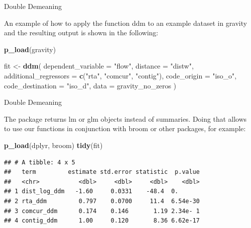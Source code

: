 \documentclass[ignorenonframetext,compress,aspectratio=169]{beamer}
\newenvironment{Shaded}{\begin{snugshade}}{\end{snugshade}}
\newcommand{\KeywordTok}[1]{\textcolor[rgb]{0.13,0.29,0.53}{\textbf{#1}}}
\newcommand{\DataTypeTok}[1]{\textcolor[rgb]{0.13,0.29,0.53}{#1}}
\newcommand{\StringTok}[1]{\textcolor[rgb]{0.31,0.60,0.02}{#1}}
\newcommand{\NormalTok}[1]{#1}
\begin{document}
\begin{frame}[fragile]{Double Demeaning}

An example of how to apply the function ddm to an example dataset in
gravity and the resulting output is shown in the following:

\begin{Shaded}
\begin{Highlighting}[]
\KeywordTok{p_load}\NormalTok{(gravity)}

\NormalTok{fit <-}\StringTok{ }\KeywordTok{ddm}\NormalTok{(}
    \DataTypeTok{dependent_variable =} \StringTok{"flow"}\NormalTok{,}
    \DataTypeTok{distance =} \StringTok{"distw"}\NormalTok{,}
    \DataTypeTok{additional_regressors =} \KeywordTok{c}\NormalTok{(}\StringTok{"rta"}\NormalTok{, }\StringTok{"comcur"}\NormalTok{, }\StringTok{"contig"}\NormalTok{),}
    \DataTypeTok{code_origin =} \StringTok{"iso_o"}\NormalTok{,}
    \DataTypeTok{code_destination =} \StringTok{"iso_d"}\NormalTok{,}
    \DataTypeTok{data =}\NormalTok{ gravity_no_zeros}
\NormalTok{  )}
\end{Highlighting}
\end{Shaded}

\end{frame}

\begin{frame}[fragile]{Double Demeaning}

The package returns lm or glm objects instead of summaries. Doing that
allows to use our functions in conjunction with broom or other packages,
for example:

\begin{Shaded}
\begin{Highlighting}[]
\KeywordTok{p_load}\NormalTok{(dplyr, broom)}
\KeywordTok{tidy}\NormalTok{(fit)}
\end{Highlighting}
\end{Shaded}

\begin{verbatim}
## # A tibble: 4 x 5
##   term         estimate std.error statistic  p.value
##   <chr>           <dbl>     <dbl>     <dbl>    <dbl>
## 1 dist_log_ddm   -1.60     0.0331    -48.4  0.      
## 2 rta_ddm         0.797    0.0700     11.4  6.54e-30
## 3 comcur_ddm      0.174    0.146       1.19 2.34e- 1
## 4 contig_ddm      1.00     0.120       8.36 6.62e-17
\end{verbatim}

\end{frame}
\end{document}
